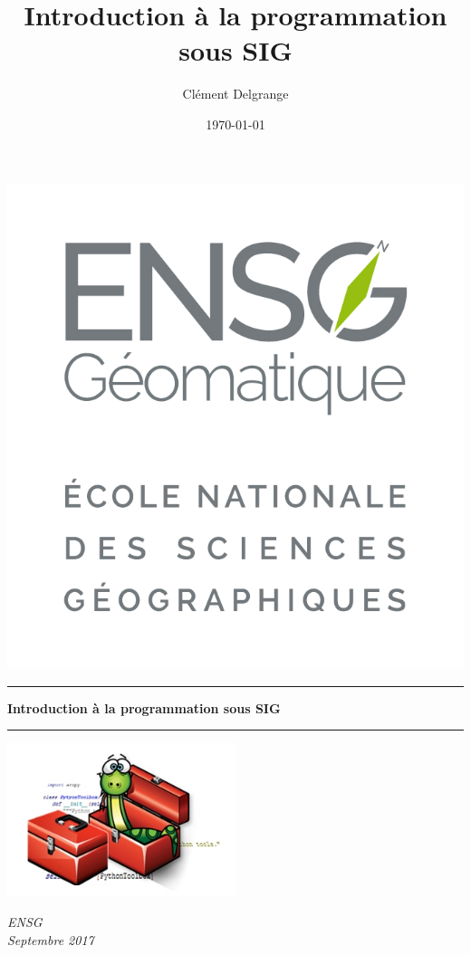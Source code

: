 \documentclass[11pt]{article}
\title{Introduction à la programmation sous SIG}
\author{Clément Delgrange}
\date{\today}
\begin{document}
	
	
\begin{titlepage}
	\begin{sffamily}
		\begin{flushleft}
			\includegraphics[scale=0.15]{img/cours/logo_ensg.png}\\[1.5cm]
		\end{flushleft}
		\begin{flushright}
		\end{flushright}
		
		\vspace{1cm}
		
		\begin{center}
			\hrule
				\vspace{0.5cm}
				{\LARGE \bfseries Introduction à la programmation sous SIG}
				\vspace{0.7cm}
			\hrule
			
			\vspace{3cm}
			\includegraphics[width=0.5\textwidth]{img/cours/img1.jpg}
			\vspace{4cm}
		
			\large \textit{ENSG}\\
			\small \textit{Septembre 2017}
		\end{center}
	\end{sffamily}
\end{titlepage}
\end{document}
